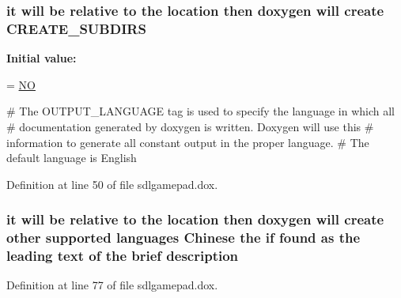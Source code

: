 \hypertarget{sdlgamepad_8dox_a77f3c876623f3cbb5ed96ca49ce6fe06}{
\subsubsection[{C\-R\-E\-A\-T\-E\-\_\-\-S\-U\-B\-D\-I\-R\-S}]{\setlength{\rightskip}{0pt plus 5cm}it will be relative to the {\bf location} then doxygen will create C\-R\-E\-A\-T\-E\-\_\-\-S\-U\-B\-D\-I\-R\-S}}\label{sdlgamepad_8dox_a77f3c876623f3cbb5ed96ca49ce6fe06}
{\bfseries Initial value\-:}
\begin{DoxyCode}
= \hyperlink{sdlgamepad_8dox_a0f6a46245280dc38baf9600906aa1393}{NO}

\textcolor{preprocessor}{# The OUTPUT\_LANGUAGE tag is used to specify the language in which all}
\textcolor{preprocessor}{}\textcolor{preprocessor}{# documentation generated by doxygen is written. Doxygen will use this}
\textcolor{preprocessor}{}\textcolor{preprocessor}{# information to generate all constant output in the proper language.}
\textcolor{preprocessor}{# The default language is English}
\end{DoxyCode}


Definition at line 50 of file sdlgamepad.\-dox.

\hypertarget{sdlgamepad_8dox_ae82208d022e4246ddf1e4f481a3f81b0}{
\subsubsection[{description}]{\setlength{\rightskip}{0pt plus 5cm}it will be relative to the {\bf location} then doxygen will create other supported languages {\bf Chinese} the {\bf if} found as the leading text of the brief description}}\label{sdlgamepad_8dox_ae82208d022e4246ddf1e4f481a3f81b0}


Definition at line 77 of file sdlgamepad.\-dox.

